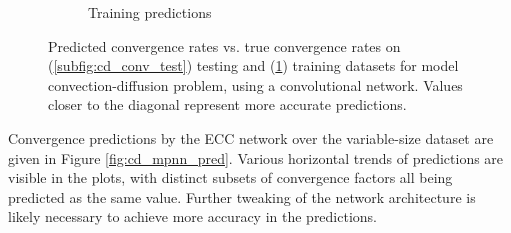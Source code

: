 \documentclass[review]{siamart190516}
\begin{document}
\begin{figure}[h]
\begin{subfigure}{.48\textwidth}
    \caption{Training predictions}
    \label{subfig:cd_conv_train}
  \end{subfigure}
  \caption{Predicted convergence rates vs. true convergence rates on (\ref{subfig:cd_conv_test}) testing and (\ref{subfig:cd_conv_train}) training datasets for model convection-diffusion problem, using a convolutional network. Values closer to the diagonal represent more accurate predictions. }
  \label{fig:cd_conv_pred}
\end{figure}

Convergence predictions by the ECC network over the variable-size dataset are given in Figure \ref{fig:cd_mpnn_pred}.  Various horizontal trends of predictions are visible in the plots, with distinct subsets of convergence factors all being predicted as the same value.  Further tweaking of the network architecture is likely necessary to achieve more accuracy in the predictions.
\end{document}

